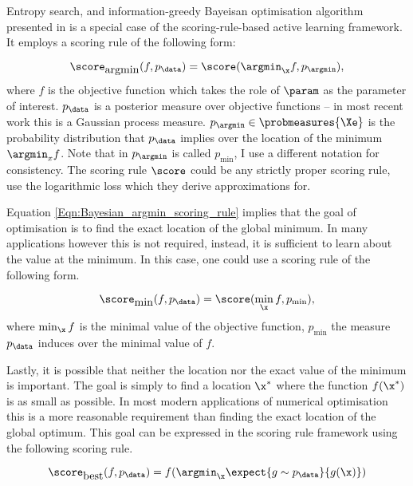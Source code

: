 Entropy search, and information-greedy Bayeisan optimisation algorithm presented in \citep{Hennig2012entropy} is a special case of the scoring-rule-based active learning framework. It employs a scoring rule of the following form:

\begin{equation}
	\score_{\mbox{argmin}}(f,p_\data) = \score(\argmin_{\x}f,p_{\argmin}), \label{Eqn:Bayesian_argmin_scoring_rule}
\end{equation}
where $f$ is the objective function which takes the role of $\param$ as the parameter of interest. $p_\data$ is a posterior measure over objective functions -- in most recent work this is a Gaussian process measure. $p_{\argmin} \in \probmeasures{\Xe}$ is the probability distribution that $p_\data$ implies over the location of the minimum $\argmin_{x}f$. Note that in \citep{Hennig2012entropy} $p_{\argmin}$ is called $p_{\min}$, I use a different notation for consistency. The scoring rule $\score$ could be any strictly proper scoring rule, \citeauthor{Hennig2012entropy} use the logarithmic loss which they derive approximations for.

Equation \eqref{Eqn:Bayesian_argmin_scoring_rule} implies that the goal of optimisation is to find the exact location of the global minimum. In many applications however this is not required, instead, it is sufficient to learn about the value at the minimum. In this case, one could use a scoring rule of the following form.

\begin{equation}
	\score_{\mbox{min}}(f,p_\data) = \score(\min_{\x}f,p_{\min}), \label{Eqn:Bayesian_argmin_scoring_rule}
\end{equation}
where $\min_{\x}f$ is the minimal value of the objective function, $p_{\min}$ the measure $p_\data$ induces over the minimal value of $f$.

Lastly, it is possible that neither the location nor the exact value of the minimum is important. The goal is simply to find a location $\x^{*}$ where the function $f(\x^{*})$ is as small as possible. In most modern applications of numerical optimisation this is a more reasonable requirement than finding the exact location of the global optimum. This goal can be expressed in the scoring rule framework using the following scoring rule.

\begin{equation}
	\score_{\mbox{best}}(f,p_\data) = f(\argmin_{\x}\expect{g\sim p_\data}{g(\x)}) \label{Eqn:Bayesian_optimisation_scoring_rule}
\end{equation}

